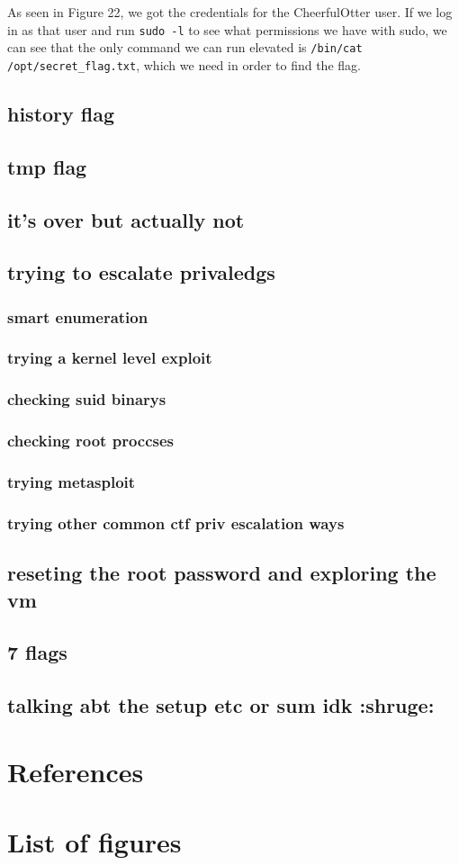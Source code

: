 \documentclass[a4paper]{article}
\begin{document}
As seen in Figure 22, we got the credentials for the CheerfulOtter user. If we log in as that user and run \texttt{sudo -l} to see what permissions we have with sudo, we can see that the only command we can run elevated is \texttt{/bin/cat /opt/secret\_flag.txt}, which we need in order to find the flag.

\subsection{history flag}
\subsection{tmp flag}
\subsection{it's over but actually not}
\subsection{trying to escalate privaledgs}
\subsubsection{smart enumeration}
\subsubsection{trying a kernel level exploit}
\subsubsection{checking suid binarys}
\subsubsection{checking root proccses}
\subsubsection{trying metasploit}
\subsubsection{trying other common ctf priv escalation ways}
\subsection{reseting the root password and exploring the vm}
\subsection{7 flags}
\subsection{talking abt the setup etc or sum idk :shruge:}

\newpage
\section{References}

\newpage
\section{List of figures}

\listoffigures
\end{document}
